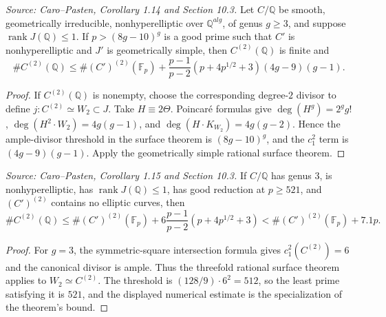 \begin{corollary}
  \label{cor:cp_quadratic_points}
  \textit{Source: Caro--Pasten, Corollary 1.14 and Section 10.3.}
  Let \(C/\mathbb Q\) be smooth, geometrically irreducible, nonhyperelliptic
  over \(\mathbb Q^{alg}\), of genus \(g\ge3\), and suppose
  \(\operatorname{rank}J(\mathbb Q)\le1\).  If
  \(p>(8g-10)^g\) is a good prime such that \(C'\) is nonhyperelliptic and
  \(J'\) is geometrically simple, then \(C^{(2)}(\mathbb Q)\) is finite and
  \[
    \#C^{(2)}(\mathbb Q)\le \#(C')^{(2)}(\mathbb F_p)
      +\frac{p-1}{p-2}(p+4p^{1/2}+3)(4g-9)(g-1).
  \]
\end{corollary}
\begin{proof}
  If \(C^{(2)}(\mathbb Q)\) is nonempty, choose the corresponding degree-\(2\)
  divisor to define \(j:C^{(2)}\simeq W_2\subset J\).  Take
  \(H\equiv2\Theta\).  Poincaré formulas give
  \(\deg(H^g)=2^g g!\), \(\deg(H^2\cdot W_2)=4g(g-1)\), and
  \(\deg(H\cdot K_{W_2})=4g(g-2)\).  Hence the ample-divisor threshold in the
  surface theorem is \((8g-10)^g\), and the \(c_1^2\) term is
  \((4g-9)(g-1)\).  Apply the geometrically simple rational surface theorem.
\end{proof}

\begin{corollary}
  \label{cor:cp_quadratic_points_genus_three}
  \textit{Source: Caro--Pasten, Corollary 1.15 and Section 10.3.}
  If \(C/\mathbb Q\) has genus \(3\), is nonhyperelliptic, has
  \(\operatorname{rank}J(\mathbb Q)\le1\), has good reduction at
  \(p\ge521\), and \((C')^{(2)}\) contains no elliptic curves, then
  \[
    \#C^{(2)}(\mathbb Q)\le \#(C')^{(2)}(\mathbb F_p)
      +6\frac{p-1}{p-2}(p+4p^{1/2}+3)
      <\#(C')^{(2)}(\mathbb F_p)+7.1p .
  \]
\end{corollary}
\begin{proof}
  For \(g=3\), the symmetric-square intersection formula gives
  \(c_1^2(C^{(2)})=6\) and the canonical divisor is ample.  Thus the
  threefold rational surface theorem applies to \(W_2\simeq C^{(2)}\).  The
  threshold is \((128/9)\cdot6^2=512\), so the least prime satisfying it is
  \(521\), and the displayed numerical estimate is the specialization of the
  theorem's bound.
\end{proof}

